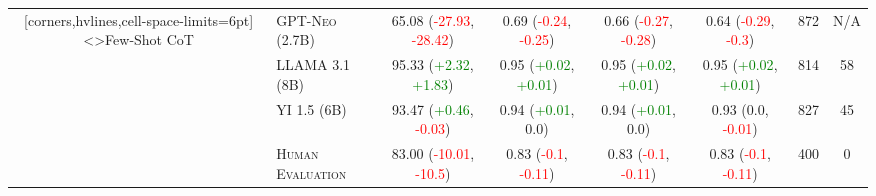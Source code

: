 \documentclass[twocolumn]{article}
\begin{document}
\begin{table}
\begin{NiceTabular}{cl*{6}{c}}[corners,hvlines,cell-space-limits=6pt]
<\rotate>{Few-Shot CoT}
	 & \textsc{GPT-Neo (2.7B)} & 65.08 (\textcolor{Red}{-27.93}, \textcolor{Red}{-28.42}) & 0.69 (\textcolor{Red}{-0.24}, \textcolor{Red}{-0.25}) & 0.66 (\textcolor{Red}{-0.27}, \textcolor{Red}{-0.28}) & 0.64 (\textcolor{Red}{-0.29}, \textcolor{Red}{-0.3}) & 872 & N/A \\
	 & \textsc{LLAMA 3.1 (8B)} & 95.33 (\textcolor{Green}{+2.32}, \textcolor{Green}{+1.83}) & 0.95 (\textcolor{Green}{+0.02}, \textcolor{Green}{+0.01}) & 0.95 (\textcolor{Green}{+0.02}, \textcolor{Green}{+0.01}) & 0.95 (\textcolor{Green}{+0.02}, \textcolor{Green}{+0.01}) & 814 & 58 \\
	 & \textsc{YI 1.5 (6B)} & 93.47 (\textcolor{Green}{+0.46}, \textcolor{Red}{-0.03}) & 0.94 (\textcolor{Green}{+0.01}, 0.0) & 0.94 (\textcolor{Green}{+0.01}, 0.0) & 0.93 (0.0, \textcolor{Red}{-0.01}) & 827 & 45 \\

	 & \textsc{Human Evaluation} & 83.00 (\textcolor{Red}{-10.01}, \textcolor{Red}{-10.5}) & 0.83 (\textcolor{Red}{-0.1}, \textcolor{Red}{-0.11}) & 0.83 (\textcolor{Red}{-0.1}, \textcolor{Red}{-0.11}) & 0.83 (\textcolor{Red}{-0.1}, \textcolor{Red}{-0.11}) & 400 & 0 \\

\end{NiceTabular}
\end{table}
\end{document}
